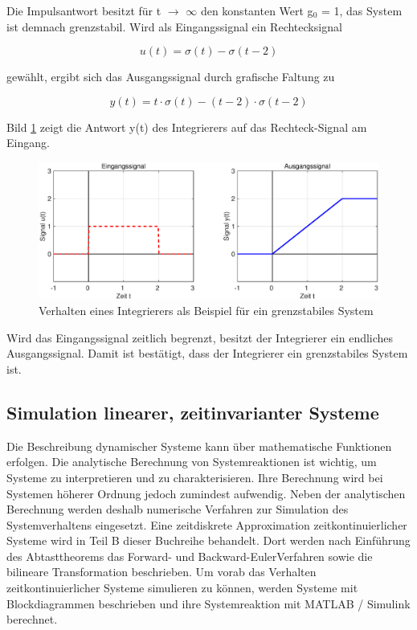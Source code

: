 \noindent Die Impulsantwort besitzt f\"{u}r t $\rightarrow$ $\mathrm{\infty}$ den konstanten Wert g${}_{0}$ = 1, das System ist demnach grenzstabil. Wird als Eingangssignal ein Rechtecksignal 

\begin{equation}\label{eq:threehundredninety}
u\left(t\right)=\sigma \left(t\right)-\sigma \left(t-2\right)
\end{equation}

\noindent gewählt, ergibt sich das Ausgangssignal durch grafische Faltung zu

\begin{equation}\label{eq:threehundredninetyone}
y\left(t\right)=t\cdot \sigma \left(t\right)-\left(t-2\right)\cdot \sigma \left(t-2\right)
\end{equation}

\noindent Bild \ref{fig:FaltungIntegrierer} zeigt die Antwort y(t) des Integrierers auf das Rechteck-Signal am Eingang.

\begin{figure}[H]
  \centerline{\includegraphics[width=1\textwidth]{Kapitel2/Bilder/image25}}
  \caption{Verhalten eines Integrierers als Beispiel für ein grenzstabiles System}
  \label{fig:FaltungIntegrierer}
\end{figure}

\noindent Wird das Eingangssignal zeitlich begrenzt, besitzt der Integrierer ein endliches Ausgangssignal. Damit ist bestätigt, dass der Integrierer ein grenzstabiles System ist. 


\subsection{Simulation linearer, zeitinvarianter Systeme}

\noindent Die Beschreibung dynamischer Systeme kann über mathematische Funktionen erfolgen. Die analytische Berechnung von Systemreaktionen ist wichtig, um Systeme zu interpretieren und zu charakterisieren.
Ihre Berechnung wird bei Systemen höherer Ordnung jedoch zumindest aufwendig. Neben der analytischen Berechnung werden deshalb numerische Verfahren zur Simulation des Systemverhaltens eingesetzt.\newline
Eine zeitdiskrete Approximation zeitkontinuierlicher Systeme wird in Teil B dieser Buchreihe behandelt. Dort werden nach Einführung des Abtasttheorems das Forward- und Backward-EulerVerfahren sowie die bilineare Transformation beschrieben. Um vorab das Verhalten zeitkontinuierlicher Systeme simulieren zu können, werden Systeme mit Blockdiagrammen beschrieben und ihre
Systemreaktion mit MATLAB / Simulink berechnet.

